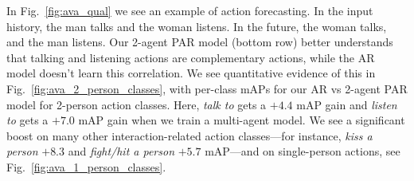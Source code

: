 In Fig.~\ref{fig:ava_qual} we see an example of action forecasting. In the input history, the man talks and the woman listens. In the future, the woman talks, and the man listens. Our 2-agent PAR model (bottom row) better understands that talking and listening actions are complementary actions, while the AR model doesn't learn this correlation. We see quantitative evidence of this in Fig.~\ref{fig:ava_2_person_classes}, with per-class mAPs for our AR vs 2-agent PAR model for 2-person action classes. Here, \textit{talk to} gets a $+4.4$ mAP gain and \textit{listen to} gets a $+7.0$ mAP gain when we train a multi-agent model. We see a significant boost on many other interaction-related action classes---for instance, \textit{kiss a person} $+8.3$ and \textit{fight/hit a person} $+5.7$ mAP---and on single-person actions, see Fig.~\ref{fig:ava_1_person_classes}.










